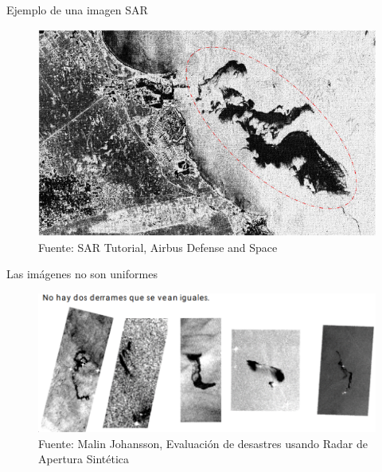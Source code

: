\begin{frame}{Ejemplo de una imagen SAR}
    \begin{figure}
        \centering
        \includegraphics[scale=0.6]{img/section_03/oil_slick}
        \caption{Fuente: SAR Tutorial, Airbus Defense and Space}
        \label{fig:section_03_dinamica_sar_petroleo}
    \end{figure}
\end{frame}

\begin{frame}{Las imágenes no son uniformes}
    \begin{figure}
        \centering
        \includegraphics[scale=0.35]{img/section_03/oil_slick_02}
        \caption{Fuente: Malin Johansson, Evaluación de desastres usando Radar de Apertura Sintética}
        \label{fig:section_03_dinamica_sar_petroleo}
    \end{figure}
\end{frame}

